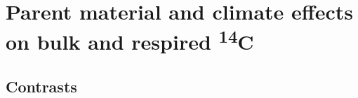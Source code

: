 \documentclass[english,man,floatsintext]{apa6}
\begin{document}
\clearpage

\hypertarget{parent-material-and-climate-effects-on-bulk-and-respired-14c}{%
\section{\texorpdfstring{Parent material and climate effects on bulk and respired \textsuperscript{14}C}{Parent material and climate effects on bulk and respired 14C}}\label{parent-material-and-climate-effects-on-bulk-and-respired-14c}}

\hypertarget{contrasts}{%
\subsection{Contrasts}\label{contrasts}}





\begingroup\fontsize{10}{12}\selectfont
\end{document}
